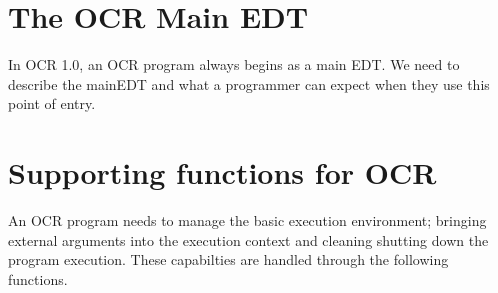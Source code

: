\section{The OCR Main EDT}
\label{sec:mainEDT}

In OCR 1.0, an OCR program always begins as a main EDT.   We need to describe the mainEDT and what a 
programmer can expect when they use this point of entry.



\section{Supporting functions for OCR}
\label{sec:supportFuncs}

An OCR program needs to manage the basic execution environment; bringing external arguments into
the execution context and cleaning shutting down the program execution.  These capabilties are
handled through the following functions.

